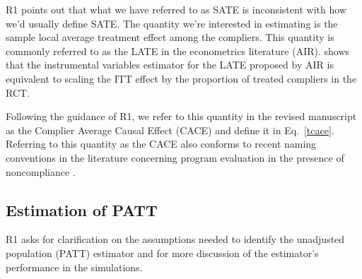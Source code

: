 \documentclass[hidelinks,12pt,letterpaper]{article}
\begin{document}
R1 points out that what we have referred to as SATE is inconsistent with how we'd usually define SATE. The quantity we're interested in estimating is the sample local average treatment effect among the compliers. This quantity is commonly referred to as the LATE in the econometrics literature \citep[e.g.,][]{Angrist1996} (AIR). \citet{freedman2006} shows that the instrumental variables estimator for the LATE proposed by AIR is equivalent to scaling the ITT effect by the proportion of treated compliers in the RCT.

Following the guidance of R1, we refer to this quantity in the revised manuscript as the Complier Average Causal Effect (CACE) and define it in Eq.~\eqref{tcace}. Referring to this quantity as the CACE also conforms to recent naming conventions in the literature concerning program evaluation in the presence of noncompliance \citep{yau2001inference,frumento2012evaluating}.

\subsection{Estimation of PATT}


R1 asks for clarification on the assumptions needed to identify the unadjusted population (PATT) estimator and for more discussion of the estimator's performance in the simulations.  
\end{document}

